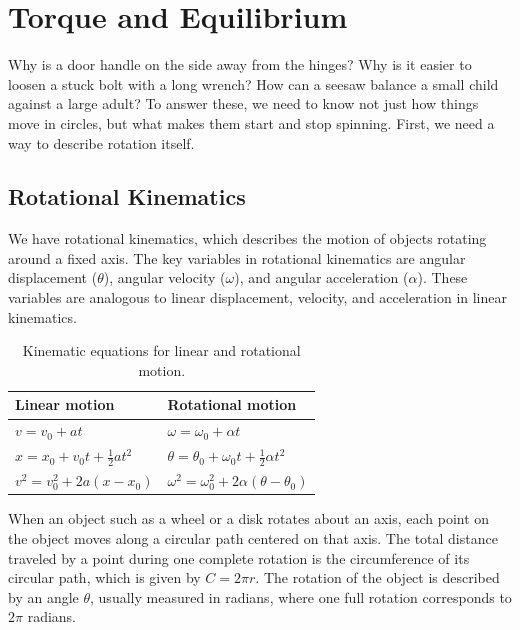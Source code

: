 \chapter{Torque and Equilibrium}

Why is a door handle on the side away from the hinges? Why is it easier to loosen a stuck bolt with a long
wrench? How can a seesaw balance a small child against a large adult? To answer these, we need to know not
just how things move in circles, but what makes them start and stop spinning. First, we need a way to
describe rotation itself.

\section{Rotational Kinematics}

We have rotational kinematics, which describes the motion of objects rotating around a fixed axis. The key variables in rotational kinematics are angular displacement ($\theta$), angular velocity ($\omega$), and angular acceleration ($\alpha$). These variables are analogous to linear displacement, velocity, and acceleration in linear kinematics.

\begin{table}[H]
\centering
\begin{tabular}{l l}
Linear motion & Rotational motion \\ \hline
$v = v_0 + a t$ & $\omega = \omega_0 + \alpha t$ \\[4pt]
$x = x_0 + v_0 t + \tfrac{1}{2} a t^2$ & $\theta = \theta_0 + \omega_0 t + \tfrac{1}{2} \alpha t^2$ \\[4pt]
$v^2 = v_0^2 + 2a(x - x_0)$ & $\omega^2 = \omega_0^2 + 2\alpha(\theta - \theta_0)$
\end{tabular}
\caption{Kinematic equations for linear and rotational motion.}
\label{tab:kinematics}
\end{table}

When an object such as a wheel or a disk rotates about an axis, each point on the object moves along a circular path centered on that axis. The total distance traveled by a point during one complete rotation is the circumference of its circular path, which is given by $ C = 2\pi r $. The rotation of the object is described by an angle $ \theta $, usually measured in radians, where one full rotation corresponds to $ 2\pi $ radians.

